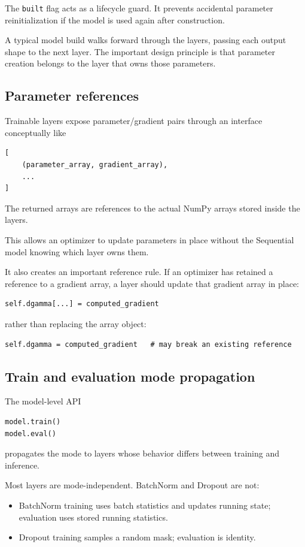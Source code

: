 \documentclass[11pt,a4paper]{article}
\newcommand{\code}[1]{\texttt{#1}}
\begin{document}
The \code{built} flag acts as a lifecycle guard. It prevents accidental parameter reinitialization if the model is used again after construction.

A typical model build walks forward through the layers, passing each output shape to the next layer. The important design principle is that parameter creation belongs to the layer that owns those parameters.

\subsection{Parameter references}

Trainable layers expose parameter/gradient pairs through an interface conceptually like
\begin{lstlisting}
[
    (parameter_array, gradient_array),
    ...
]
\end{lstlisting}
The returned arrays are references to the actual NumPy arrays stored inside the layers.

This allows an optimizer to update parameters in place without the Sequential model knowing which layer owns them.

It also creates an important reference rule. If an optimizer has retained a reference to a gradient array, a layer should update that gradient array in place:
\begin{lstlisting}
self.dgamma[...] = computed_gradient
\end{lstlisting}
rather than replacing the array object:
\begin{lstlisting}
self.dgamma = computed_gradient   # may break an existing reference
\end{lstlisting}

\subsection{Train and evaluation mode propagation}

The model-level API
\begin{lstlisting}
model.train()
model.eval()
\end{lstlisting}
propagates the mode to layers whose behavior differs between training and inference.

Most layers are mode-independent. BatchNorm and Dropout are not:
\begin{itemize}
    \item BatchNorm training uses batch statistics and updates running state; evaluation uses stored running statistics.
    \item Dropout training samples a random mask; evaluation is identity.
\end{itemize}
\end{document}
